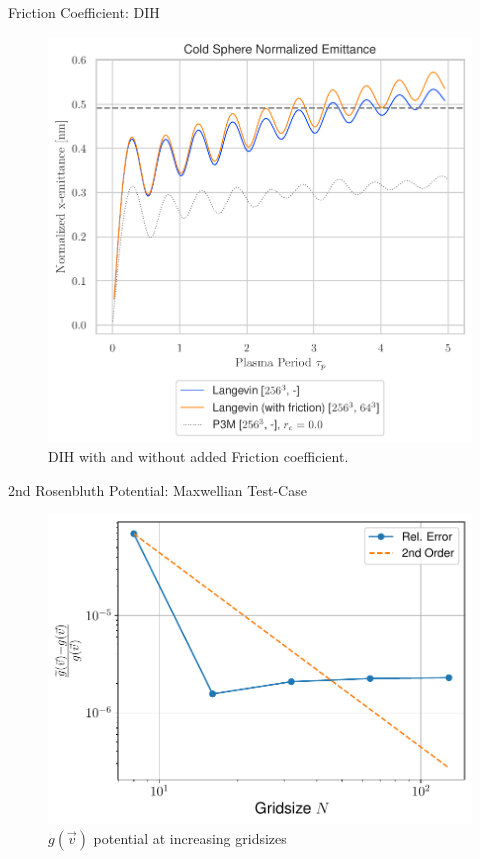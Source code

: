 \begin{frame}[c]{Friction Coefficient: DIH}
    \begin{figure}[!htb]
        \centering
        \captionsetup{justification=centering}
      \includegraphics[width=0.7\linewidth]{figures/friction_Nemittance.pdf}
      \caption{DIH with and without added Friction coefficient.}
      \label{fig:Fd_asymptotic_behavior_2nd}
    \end{figure}
\end{frame}

\begin{frame}[c]{2nd Rosenbluth Potential: Maxwellian Test-Case}
    \begin{figure}[!htb]
        \centering
        \captionsetup{justification=centering}
      \includegraphics[width=0.7\linewidth]{figures/diffusion_error_convergence.pdf}
      \caption{$g(\vec v)$ potential at increasing gridsizes}
      \label{fig:diffusion_coefficient_convergence}
    \end{figure}
\end{frame}

